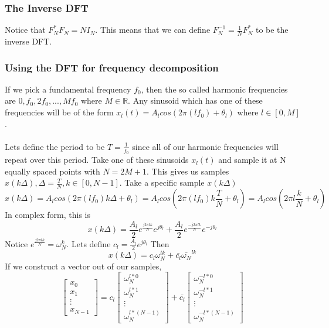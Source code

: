 \documentclass{article}
\begin{document}
\subsubsection{The Inverse DFT}
Notice that $F_N^*F_N = NI_N$. This means that we can define $F_N^{-1}=\frac{1}{N}F_N^*$ to be the inverse DFT.
\subsubsection{Using the DFT for frequency decomposition}
If we pick a fundamental frequency $f_0$, then the so called harmonic frequencies are $0, f_0, 2f_0, ..., Mf_0$
where $M\in\mathbb{R}$. Any sinusoid which has one of these frequencies will be of the form $x_l(t) = A_lcos(2\pi(lf_0)+\theta_l)$
where $l\in[0, M]$.\\\\
Lets define the period to be $T = \frac{1}{f_0}$ since all of our harmonic frequencies will repeat over this period.
Take one of these sinusoids $x_l(t)$ and sample it at N equally spaced points with $N = 2M+1$.
This gives us samples $x(k\Delta), \Delta=\frac{T}{N}, k\in[0, N-1]$.
Take a specific sample $x(k\Delta)$
$$x(k\Delta) = A_lcos(2\pi(lf_0)k\Delta+\theta_l)=A_lcos(2\pi(lf_0)k\frac{T}{N}+\theta_l) = A_lcos(2\pi l\frac{k}{N}+\theta_l)$$
In complex form, this is
$$x(k\Delta) = \frac{A_l}{2}e^{\frac{j2\pi lk}{N}}e^{j\theta_l} + \frac{A_l}{2}e^{\frac{-j2\pi lk}{N}}e^{-j\theta_l}$$
Notice $e^{\frac{j2\pi lk}{N}} = \omega_N^k$. Lets define $c_l=\frac{A_l}{2}e^{j\theta_l}$
Then $$x(k\Delta) = c_l\omega_N^{lk}+\bar{c_l}\bar{\omega_N}^{lk}$$
If we construct a vector out of our samples,
\[
    \left[
        \begin{array}{c}
            x_0\\
            x_1\\
            \vdots\\
            x_{N-1}
        \end{array}
    \right] = c_l \left[
        \begin{array}{c}
            \omega_N^{l*0}\\
            \omega_N^{l*1}\\
            \vdots\\
            \omega_N^{l*(N-1)}
        \end{array}
    \right] + \bar{c_l}\left[
        \begin{array}{c}
            \omega_N^{-l*0}\\
            \omega_N^{-l*1}\\
            \vdots\\
            \omega_N^{-l*(N-1)}
        \end{array}
    \right]
\]
\end{document}
